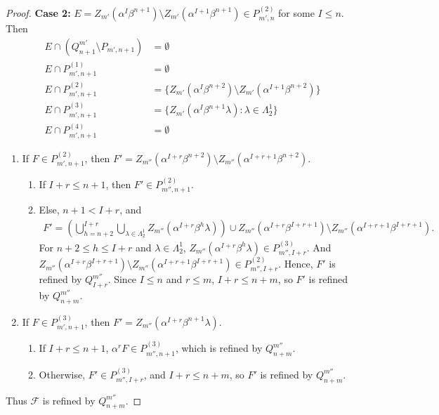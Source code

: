 \documentclass[12pt]{amsart}
\newcommand{\sm}{\setminus}
\newcommand{\mc}[1]{\mathcal{#1}}
\newcommand{\emp}{\emptyset}
\newcommand{\al}{\alpha}
\newcommand{\be}{\beta}
\newcommand{\la}{\lambda}
\newcommand{\La}{\Lambda}
\theoremstyle{plain} %
\theoremstyle{definition} %
\begin{document}
\begin{proof}
    \textbf{Case 2:} $E = Z_{m'}(\al^{I}\be^{n+1}) \sm Z_{m'}(\al^{I+1}\be^{n+1}) \in P_{m',n}^{(2)}$ for some $I \leq n$. Then
    \begin{align*}
        E \cap (Q^{m'}_{n+1} \sm P_{m', n+1}) &= \emp\\
        E \cap P^{(1)}_{m',n+1} &= \emp \\
        E \cap P^{(2)}_{m',n+1} &= \{ Z_{m'}(\al^{I}\be^{n+2}) \sm Z_{m'}(\al^{I+1} \be^{n+2}) \}\\
        E \cap P^{(3)}_{m',n+1} &= \{ Z_{m'}(\al^{I}\be^{n+1} \la) : \la \in \La_2^1\} \\
        E \cap P^{(4)}_{m',n+1} &= \emp
    \end{align*}
    \begin{enumerate}
        \item If $F \in P^{(2)}_{m',n+1}$, then $F' = Z_{m''}(\al^{I+r}\be^{n+2})\sm Z_{m''}(\al^{I+r+1}\be^{n+2})$.
    \begin{enumerate}
        \item If $I+r \leq n+1$, then $F' \in P^{(2)}_{m'', n+1}$.
        \item Else, $n+1 < I+r$, and \begin{align*}
            F' = \left(\bigcup_{h=n+2}^{I+r} \bigcup_{\la \in \La_2^1} Z_{m''}(\al^{I+r}\be^h \la) \right) \cup Z_{m''}(\al^{I+r} \be^{I+r+1}) \sm Z_{m''}(\al^{I+r+1}\be^{I+r+1}).
        \end{align*}
        For $n+2 \leq h \leq I+r$ and $\la \in \La_2^1$, $Z_{m''}(\al^{I+r}\be^h \la) \in P^{(3)}_{m'', I+r}$. And $Z_{m''}(\al^{I+r} \be^{I+r+1}) \sm Z_{m''}(\al^{I+r+1}\be^{I+r+1}) \in P^{(2)}_{m'', I+r}$. Hence, $F'$ is refined by $Q_{I+r}^{m''}$. Since $I \leq n$ and $r \leq m$, $I+r \leq n+m$, so $F'$ is refined by $Q^{m''}_{n+m}$.
    \end{enumerate}

    \item If $F \in P^{(3)}_{m',n+1}$, then $F' = Z_{m''}(\al^{I+r}\be^{n+1}\la)$.
    \begin{enumerate}
        \item If $I+r \leq n+1$, $\al^r F \in P^{(3)}_{m'', n+1}$, which is refined by $Q_{n+m}^{m''}$.
        
        \item Otherwise, $F' \in P_{m'', I+r}^{(3)}$, and $I+r \leq n+m$, so $F'$ is refined by $Q_{n+m}^{m''}$.
    \end{enumerate}
    \end{enumerate}
    Thus $\mc{F}$ is refined by $Q^{m''}_{n+m}$.


\end{proof}
\end{document}
